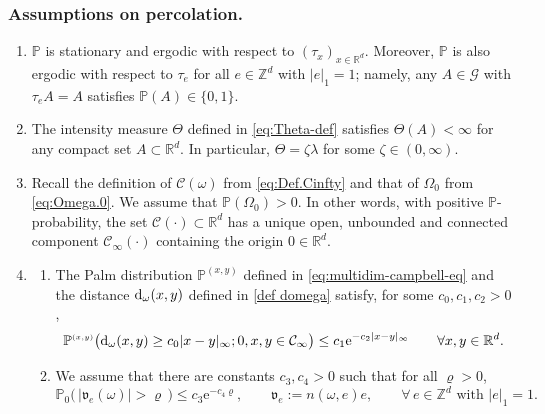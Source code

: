 \documentclass[11pt]{article}
\renewcommand{\d}{{\rm d}}
\newcommand{\e}{\mathrm e}
\newcommand{\R}{\mathbb R}
\newcommand{\Z}{\mathbb Z}
\renewcommand{\P}{\mathbb P}
\newcommand{\ssup}[1]{{\scriptscriptstyle({#1})}}
\theoremstyle{rem}
\begin{document}
\subsubsection{Assumptions on percolation.}\label{subsec assump perc}

\begin{enumerate}[label=\textbf{(P\arabic*)}]
\itemsep0.2em

\item $\P$ is stationary and ergodic with respect to $(\tau_x)_{x\in
    \R^d}$. Moreover, $\P$ is also ergodic with respect to $\tau_e$
  for all $e\in \Z^d$ with $|e|_1=1$; namely, any $A\in \mathcal{G}$ with
  $\tau_e A = A$ satisfies $\P(A)\in \{0,1\}$.
  \label{assump:est-erg}

\item The intensity measure $\Theta$ defined in \eqref{eq:Theta-def} satisfies
  $\Theta(A)<\infty$ for any compact set $A\subset \R^d$. In particular,
  $\Theta=\zeta \lambda$ for some $\zeta\in (0,\infty)$.
  \label{assump:intensity}

\item Recall the definition of $\mathcal C(\omega)$ from \eqref{eq:Def.Cinfty}
and that of $\Omega_0$ from \eqref{eq:Omega.0}. We assume that
$\P(\Omega_0)>0$. In other words, with positive $\P$-probability, the set
$\mathcal C(\cdot)\subset \R^d$ has a unique open, unbounded and connected
component $\mathcal C_\infty(\cdot)$ containing the origin $0\in \R^d$.
\label{assump:inf-comp}

\item
\begin{enumerate}
\item The Palm distribution $\P^{\ssup{x,y}}$ defined in
\eqref{eq:multidim-campbell-eq} and the distance $\d_\omega(x,y)$ defined in
\eqref{def domega} satisfy, for some $c_0,c_1,c_2>0$,
\begin{equation}
\label{eq:chem_dist_ineq}
\P^{\ssup{x,y}} \big(\d_\omega(x,y)\geq
  c_0|x-y|_{\infty}; 0,x,y\in {\mathcal C_\infty}\big)
  \leq c_1 \e^{-c_2 |x-y|_{\infty}}
  \qquad \forall x,y\in \R^d.
\end{equation}

\item We assume that there are constants $c_3,c_4>0$ such that for all
$\varrho>0$,
\begin{equation}\label{eq:exp-dec-dist-indshift}
\P_0\big( \,|\mathfrak{v}_e(\omega)|>\varrho \,\big)
\leq c_3\e^{- c_4 \varrho},
\qquad
\mathfrak v_e:=n(\omega,e) e,
\qquad
\forall\, e\in \Z^d \text{ with }|e|_1=1.
\end{equation}
\label{assump:exp-dec-dist-indshift}
\end{enumerate}
\label{assump:chem-dist}


\end{enumerate}
\end{document}
